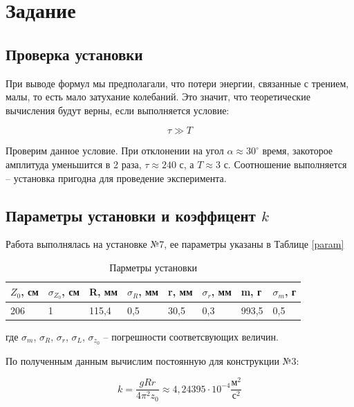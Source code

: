 \documentclass[a4paper,14pt]{extarticle}
\begin{document}
	\section{Задание}
	\subsection{Проверка установки}
	
	При выводе формул мы предполагали, что потери энергии, связанные с трением, малы, то есть мало затухание колебаний. Это значит, что теоретические вычисления будут верны, если выполняется условие:
	
	\begin{equation}
		\tau \gg T
	\end{equation}
	
	Проверим данное условие. При отклонении на угол $\alpha \approx 30^\circ$ время, закоторое амплитуда уменьшится в 2 раза, $\tau \approx 240\text{ с}$, а $T \approx 3\text{ с}$. Соотношение выполняется -- установка пригодна для проведение эксперимента.
	
	\subsection{Параметры установки и коэффицент $k$}
	
	Работа выполнялась на установке №7, ее параметры указаны в Таблице \eqref{param}
	\begin{table}[!ht]
		\begin{center}
			\begin{tabular}{|l|l|l|l|l|l|l|l|}
				\hline
				$Z_0$, см & $\sigma_{Z_0}$, см & R, мм  & $\sigma_R$, мм & r, мм & $\sigma_r$, мм  & m, г & $\sigma_m$, г  \\ \hline
				206 & 1 & 115,4 & 0,5 & 30,5 & 0,3 & 993,5 & 0,5 \\ \hline
			\end{tabular}
			\caption{Парметры установки}
			\label{param}
		\end{center}
	\end{table}
	
	\noindent где $\sigma_m$, $\sigma_R$, $\sigma_r$, $\sigma_L$, $\sigma_{z_0}$ -- погрешности соответсвующих величин.
	
	\bigskip
	
	По полученным данным вычислим постоянную для конструкции №3:
	
	\begin{equation}
		k = \frac{gRr}{4\pi^2z_0} \approx 4,24395\cdot 10^{-4} \frac{\text{м}^2}{\text{с}^2}
	\end{equation}
	
\end{document}
